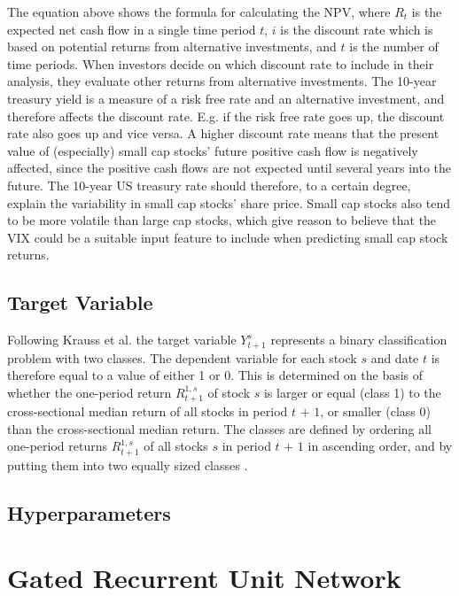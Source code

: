 \indent\newline
The equation above shows the formula for calculating the NPV, where $R_{t}$ is the expected net cash flow in a single time period $\textit{t}$, $\textit{i}$ is the discount rate which is based on potential returns from alternative investments, and $\textit{t}$ is the number of time periods. When investors decide on which discount rate to include in their analysis, they evaluate other returns from alternative investments. The 10-year treasury yield is a measure of a risk free rate and an alternative investment, and therefore affects the discount rate. E.g. if the risk free rate goes up, the discount rate also goes up and vice versa. A higher discount rate means that the present value of (especially) small cap stocks' future positive cash flow is negatively affected, since the positive cash flows are not expected until several years into the future. The 10-year US treasury rate should therefore, to a certain degree, explain the variability in small cap stocks' share price. Small cap stocks also tend to be more volatile than large cap stocks, which give reason to believe that the VIX could be a suitable input feature to include when predicting small cap stock returns. 

\subsection{Target Variable}
Following Krauss et al. the target variable $Y^{s}_{t + 1}$ represents a binary classification problem with two classes. The dependent variable for each stock $\textit{s}$ and date $\textit{t}$ is therefore equal to a value of either 1 or 0. This is determined on the basis of whether the one-period return $R^{1,s}_{t + 1}$ of stock $\textit{s}$ is larger or equal (class 1) to the cross-sectional median return of all stocks in period $\textit{t + 1}$, or smaller (class 0) than the cross-sectional median return. The classes are defined by ordering all one-period returns $R^{1,s}_{t + 1}$ of all stocks $\textit{s}$ in period $\textit{t + 1}$ in ascending order, and by putting them into two equally sized classes \cite{krauss}.   


\subsection{Hyperparameters}

\section{Gated Recurrent Unit Network}

